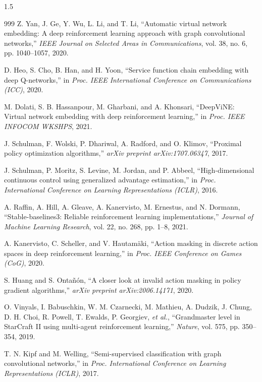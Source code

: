 \documentclass[A4paper,12pt]{report}
\theoremstyle{plain}
\theoremstyle{definition}
\theoremstyle{remark}
\numberwithin{equation}{section}
\begin{document}
\begin{spacing}{1.5}
\begin{thebibliography}{999}
Z. Yan, J. Ge, Y. Wu, L. Li, and T. Li, ``Automatic virtual network embedding: A deep reinforcement learning approach with graph convolutional networks,'' \textit{IEEE Journal on Selected Areas in Communications}, vol. 38, no. 6, pp. 1040--1057, 2020.

D. Heo, S. Cho, B. Han, and H. Yoon, ``Service function chain embedding with deep Q-networks,'' in \textit{Proc. IEEE International Conference on Communications (ICC)}, 2020.

M. Dolati, S. B. Hassanpour, M. Gharbani, and A. Khonsari, ``DeepViNE: Virtual network embedding with deep reinforcement learning,'' in \textit{Proc. IEEE INFOCOM WKSHPS}, 2021.

J. Schulman, F. Wolski, P. Dhariwal, A. Radford, and O. Klimov, ``Proximal policy optimization algorithms,'' \textit{arXiv preprint arXiv:1707.06347}, 2017.

J. Schulman, P. Moritz, S. Levine, M. Jordan, and P. Abbeel, ``High-dimensional continuous control using generalized advantage estimation,'' in \textit{Proc. International Conference on Learning Representations (ICLR)}, 2016.

A. Raffin, A. Hill, A. Gleave, A. Kanervisto, M. Ernestus, and N. Dormann, ``Stable-baselines3: Reliable reinforcement learning implementations,'' \textit{Journal of Machine Learning Research}, vol. 22, no. 268, pp. 1--8, 2021.

A. Kanervisto, C. Scheller, and V. Hautam\"{a}ki, ``Action masking in discrete action spaces in deep reinforcement learning,'' in \textit{Proc. IEEE Conference on Games (CoG)}, 2020.

S. Huang and S. Ontañón, ``A closer look at invalid action masking in policy gradient algorithms,'' \textit{arXiv preprint arXiv:2006.14171}, 2020.

O. Vinyals, I. Babuschkin, W. M. Czarnecki, M. Mathieu, A. Dudzik, J. Chung, D. H. Choi, R. Powell, T. Ewalds, P. Georgiev, \textit{et al.}, ``Grandmaster level in StarCraft II using multi-agent reinforcement learning,'' \textit{Nature}, vol. 575, pp. 350--354, 2019.

T. N. Kipf and M. Welling, ``Semi-supervised classification with graph convolutional networks,'' in \textit{Proc. International Conference on Learning Representations (ICLR)}, 2017.


\end{thebibliography}
\end{spacing}
\end{document}
